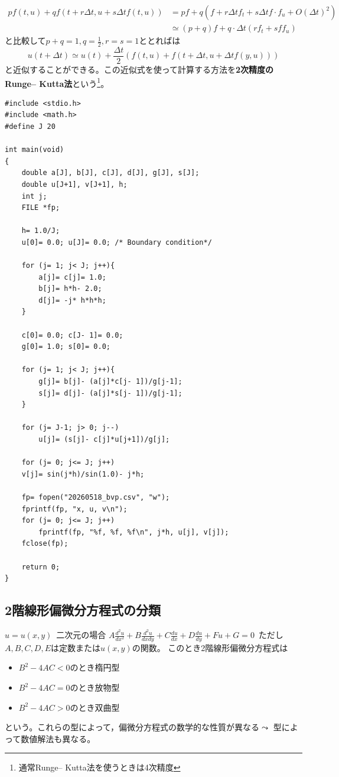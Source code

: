 \documentclass{jsreport}
\begin{document}
\begin{align*}
	pf(t, u)+ qf(t+ r\Delta t, u+ s\Delta tf(t, u))
	&= pf +q(f+ r\Delta tf_t+ s\Delta tf\cdot f_u+ O(\Delta t)^2)\\
	&\simeq (p+ q)f+ q\cdot \Delta t(rf_t+ sff_u)
\end{align*}
	と比較して$p+ q= 1, q= \frac{1}{2}, r= s= 1$ととればは
\begin{equation}
	u(t+ \Delta t)\simeq u(t)+ \frac{\Delta t}{2}\left(f(t, u)+ f(t+ \Delta t, u+ \Delta tf(y, u))\right)
\end{equation}
	と近似することができる。この近似式を使って計算する方法を\textbf{2次精度のRunge– Kutta法}という\footnote{通常Runge– Kutta法を使うときは4次精度}。

\begin{tcolorbox}
\begin{lstlisting}
#include <stdio.h>
#include <math.h>
#define J 20

int main(void)
{
    double a[J], b[J], c[J], d[J], g[J], s[J];
    double u[J+1], v[J+1], h;
    int j;
    FILE *fp;
    
    h= 1.0/J;
    u[0]= 0.0; u[J]= 0.0; /* Boundary condition*/

    for (j= 1; j< J; j++){
        a[j]= c[j]= 1.0;
        b[j]= h*h- 2.0;
        d[j]= -j* h*h*h;
    }

    c[0]= 0.0; c[J- 1]= 0.0;
    g[0]= 1.0; s[0]= 0.0;
    
    for (j= 1; j< J; j++){
        g[j]= b[j]- (a[j]*c[j- 1])/g[j-1];
        s[j]= d[j]- (a[j]*s[j- 1])/g[j-1];
    }

    for (j= J-1; j> 0; j--)
        u[j]= (s[j]- c[j]*u[j+1])/g[j];

    for (j= 0; j<= J; j++)
    v[j]= sin(j*h)/sin(1.0)- j*h;

    fp= fopen("20260518_bvp.csv", "w");
    fprintf(fp, "x, u, v\n");
    for (j= 0; j<= J; j++)
        fprintf(fp, "%f, %f, %f\n", j*h, u[j], v[j]);
    fclose(fp);

    return 0;
}
\end{lstlisting}
\end{tcolorbox}

\subsection{2階線形偏微分方程式の分類}
	$u= u(x, y)$\ 二次元の場合
	$A\frac{d^2u}{dx^2}+ B\frac{d^2u}{dxdy}+ C\frac{du}{dx}+ D\frac{du}{dy}+ Fu+ G= 0$\ ただし$A, B, C, D, E$は定数または$u(x, y)$の関数。
	このとき2階線形偏微分方程式は
\begin{itemize}
	\item $B^2- 4AC< 0$のとき楕円型
	\item $B^2- 4AC= 0$のとき放物型
	\item $B^2- 4AC> 0$のとき双曲型
\end{itemize}
	という。これらの型によって，偏微分方程式の数学的な性質が異なる$\leadsto$ 型によって数値解法も異なる。
\end{document}
